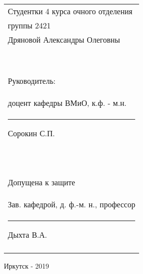 \begin{titlepage}
\hfill \break
\hfill \break
\begin{flushright} %
\begin{tabular}{p{}} %


Студентки 4 курса очного отделения\\
группы 2421\\
Дряновой Александры Олеговны\\\

Руководитель:\\
доцент кафедры ВМиО, к.ф. - м.н.\\
\rule{3cm}{0.25pt}  Сорокин С.П.\\\

Допущена к защите\\
Зав. кафедрой, д. ф.-м. н., профессор\\
 \rule{3cm}{0.25pt}  Дыхта В.А.\\\\

\end{tabular}
\end{flushright}
\hfill \break
\begin{center} Иркутск - 2019 \end{center}
\thispagestyle{empty}
\end{titlepage}

\onehalfspacing